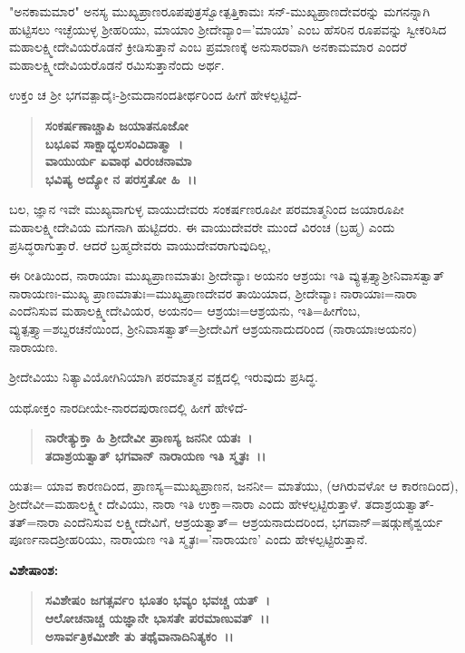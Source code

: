 "ಅನಕಾಮಮಾರ" ಅನಸ್ಯ ಮುಖ್ಯಪ್ರಾಣರೂಪಪುತ್ರಸ್ವೋತ್ಪತ್ತಿಕಾಮಃ ಸನ್-ಮುಖ್ಯಪ್ರಾಣದೇವರನ್ನು ಮಗನನ್ನಾಗಿ ಹುಟ್ಟಿಸಲು ಇಚ್ಛೆಯುಳ್ಳ ಶ‍್ರೀಹರಿಯು, ಮಾಯಾಂ ಶ‍್ರೀದೇವ್ಯಾಂ='ಮಾಯಾ' ಎಂಬ ಹೆಸರಿನ ರೂಪವನ್ನು ಸ್ವೀಕರಿಸಿದ ಮಹಾಲಕ್ಷ್ಮೀದೇವಿಯರೊಡನೆ ಕ್ರೀಡಿಸುತ್ತಾನೆ ಎಂಬ ಪ್ರಮಾಣಕ್ಕೆ ಅನುಸಾರವಾಗಿ ಅನಕಾಮಮಾರ ಎಂದರೆ ಮಹಾಲಕ್ಷ್ಮೀದೇವಿಯರೊಡನೆ ರಮಿಸುತ್ತಾನೆಂದು ಅರ್ಥ.

ಉಕ್ತಂ ಚ ಶ‍್ರೀ ಭಗವತ್ಪಾದೈಃ-ಶ‍್ರೀಮದಾನಂದತೀರ್ಥರಿಂದ ಹೀಗೆ ಹೇಳಲ್ಪಟ್ಟಿದೆ-

\begin{verse}
\textbf{ಸಂಕರ್ಷಣಾಚ್ಚಾಪಿ ಜಯಾತನೂಜೋ}\\\textbf{ಬಭೂವ ಸಾಕ್ಷಾದ್ಭಲಸಂವಿದಾತ್ಮಾ~।}\\\textbf{ವಾಯುರ್ಯ ಏವಾಥ ವಿರಂಚನಾಮಾ}\\\textbf{ಭವಿಷ್ಯ ಅದ್ಯೋ ನ ಪರಸ್ತತೋ ಹಿ~।।}
\end{verse}

\noindent
ಬಲ, ಜ್ಞಾನ ಇವೇ ಮುಖ್ಯವಾಗುಳ್ಳ ವಾಯುದೇವರು ಸಂಕರ್ಷಣರೂಪೀ ಪರಮಾತ್ಮನಿಂದ ಜಯಾರೂಪೀ ಮಹಾಲಕ್ಷ್ಮೀದೇವಿಯ ಮಗನಾಗಿ ಹುಟ್ಟಿದರು. ಈ ವಾಯುದೇವರೇ ಮುಂದೆ ವಿರಂಚ (ಬ್ರಹ್ಮ) ಎಂದು ಪ್ರಸಿದ್ಧರಾಗುತ್ತಾರೆ. ಆದರೆ ಬ್ರಹ್ಮದೇವರು ವಾಯುದೇವರಾಗುವುದಿಲ್ಲ,

ಈ ರೀತಿಯಿಂದ, ನಾರಾಯಾಃ ಮುಖ್ಯಪ್ರಾಣಮಾತುಃ ಶ‍್ರೀದೇವ್ಯಾಃ ಅಯನಂ ಆಶ್ರಯಃ ಇತಿ ವ್ಯುತ್ಪತ್ತ್ಯಾಶ‍್ರೀನಿವಾಸತ್ವಾತ್ ನಾರಾಯಣಃ-ಮುಖ್ಯ ಪ್ರಾಣಮಾತುಃ=ಮುಖ್ಯ\-ಪ್ರಾಣದೇವರ ತಾಯಿಯಾದ, ಶ‍್ರೀದೇವ್ಯಾಃ ನಾರಾಯಾಃ=ನಾರಾ ಎಂದೆನಿಸುವ ಮಹಾಲಕ್ಷ್ಮೀದೇವಿಯರ, ಅಯನಂ= ಆಶ್ರಯಃ=ಆಶ್ರಯನು, ಇತಿ=ಹೀಗೆಂಬ, ವ್ಯುತ್ಪತ್ತ್ಯಾ=ಶಬ್ದ\-ರಚನೆಯಿಂದ, ಶ‍್ರೀನಿವಾಸತ್ವಾತ್=ಶ‍್ರೀದೇವಿಗೆ ಆಶ್ರಯನಾದುದರಿಂದ (ನಾರಾಯಾಃ\break ಅಯನಂ) ನಾರಾಯಣ.

ಶ‍್ರೀದೇವಿಯು ನಿತ್ಯಾವಿಯೋಗಿನಿಯಾಗಿ ಪರಮಾತ್ಮನ ವಕ್ಷದಲ್ಲಿ ಇರುವುದು ಪ್ರಸಿದ್ಧ.

ಯಥೋಕ್ತಂ ನಾರದೀಯೇ-ನಾರದಪುರಾಣದಲ್ಲಿ ಹೀಗೆ ಹೇಳಿದೆ-

\begin{verse}
\textbf{ನಾರೇತ್ಯುಕ್ತಾ ಹಿ ಶ‍್ರೀದೇವೀ ಪ್ರಾಣಸ್ಯ ಜನನೀ ಯತಃ~।}\\\textbf{ತದಾಶ್ರಯತ್ವಾತ್ ಭಗವಾನ್ ನಾರಾಯಣ ಇತಿ ಸ್ಮೃತಃ~।।}
\end{verse}

\noindent
ಯತಃ= ಯಾವ ಕಾರಣದಿಂದ, ಪ್ರಾಣಸ್ಯ=ಮುಖ್ಯಪ್ರಾಣನ, ಜನನೀ= ಮಾತೆಯು, (ಆಗಿರು\-ವಳೋ ಆ ಕಾರಣದಿಂದ), ಶ‍್ರೀದೇವೀ=ಮಹಾಲಕ್ಷ್ಮೀ ದೇವಿಯು, ನಾರಾ ಇತಿ ಉಕ್ತಾ=ನಾರಾ ಎಂದು ಹೇಳಲ್ಪಟ್ಟಿರುತ್ತಾಳೆ. ತದಾಶ್ರಯತ್ವಾತ್-ತತ್=ನಾರಾ ಎಂದೆನಿಸುವ ಲಕ್ಷ್ಮೀದೇವಿಗೆ, ಆಶ್ರಯತ್ವಾತ್= ಆಶ್ರಯನಾದುದರಿಂದ, ಭಗವಾನ್=ಷಡ್ಗುಣೈಶ್ವರ್ಯ ಪೂರ್ಣನಾದ\break ಶ‍್ರೀಹರಿಯು, ನಾರಾಯಣ ಇತಿ ಸ್ಮೃತಃ='ನಾರಾಯಣ' ಎಂದು ಹೇಳಲ್ಪಟ್ಟಿರುತ್ತಾನೆ.

\noindent
\textbf{ವಿಶೇಷಾಂಶ:\enginline{-}}

\begin{verse}
\textbf{ಸವಿಶೇಷಂ ಜಗತ್ಸರ್ವಂ ಭೂತಂ ಭವ್ಯಂ ಭವಚ್ಚ ಯತ್~।}\\\textbf{ಆಲೋಚನಾಚ್ಚ ಯಜ್ಞಾನೇ ಭಾಸತೇ ಪರಮಾಣುವತ್~।।}\\\textbf{ಅಸಾರ್ವತ್ರಿಕಮೀಶೇ ತು ತಥೈವಾನಾದಿನಿತ್ಯಕಂ~।।}
\end{verse}

